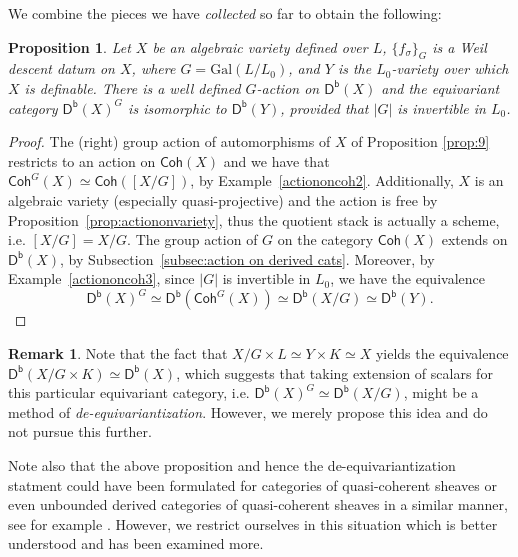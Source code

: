 \documentclass[10pt]{amsart}
\newtheorem{proposition}[theorem]{Proposition}
\theoremstyle{definition}
\newtheorem{remark}[theorem]{Remark}
\newcommand{\Gal}{{ \mathrm{Gal}}}
\begin{document}
We combine the pieces we have {\em collected} so far to obtain the following:


\begin{proposition}\label{prop:equivariant descent theorem}
Let $X$ be an algebraic variety defined over $L$, $\{f_{\sigma} \}_G$ is a Weil descent datum on $X$, where $G=\Gal(L/ L_0)$, and $Y$ is the $L_0$-variety over which $X$ is definable. There is a well defined $G$-action on $\mathsf{D^b}(X)$ and the equivariant category $\mathsf{D^b}(X)^G$ is isomorphic to $\mathsf{D^b}(Y)$, provided that $|G|$ is invertible in $L_0$.
\end{proposition}

\begin{proof}
The (right) group action of automorphisms of $X$ of Proposition \ref{prop:9} restricts to an action on $\mathsf{Coh}(X)$ and we have that $\mathsf{Coh}^G(X) \simeq \mathsf{Coh}([X/G])$, by Example~\ref{actiononcoh2}. Additionally, $X$ is an algebraic variety (especially quasi-projective) and the action is free by Proposition~\ref{prop:actiononvariety}, thus the quotient stack is actually a scheme, i.e. $[X/G] = X/G$. 
The group action of $G$ on the category $\mathsf{Coh}(X)$ extends on $\mathsf{D^b}(X)$, by Subsection~\ref{subsec:action on derived cats}.
Moreover, by Example~\ref{actiononcoh3}, since $|G|$ is invertible in $L_0$, we have the equivalence 
\[
\mathsf{D^b}(X)^G \simeq \mathsf{D^b}(\mathsf{Coh}^G(X)) \simeq \mathsf{D^b}(X/G) \simeq \mathsf{D^b}(Y).
\]
\end{proof}

\begin{remark}\label{rem: de-equivariantization}
Note that the fact that $X/G \times L \simeq Y \times K \simeq X$ yields the equivalence $\mathsf{D^b}(X/G \times K ) \simeq \mathsf{D^b}(X)$, which suggests that taking extension of scalars for this particular  equivariant category, i.e. $\mathsf{D^b}(X)^G \simeq \mathsf{D^b}(X/G)$, might be a method of {\em de-equivariantization}. However, we merely propose this idea and do not pursue this further.

Note also that the above proposition and hence the de-equivariantization statment could have been formulated for categories of quasi-coherent sheaves or even unbounded derived categories of quasi-coherent sheaves in a similar manner, see for example \cite[Remark 7.1]{karakikes2025equivariantrecollementssingularequivalences}. However, we restrict ourselves in this situation which is better understood and has been examined more. 
\end{remark}
\end{document}
